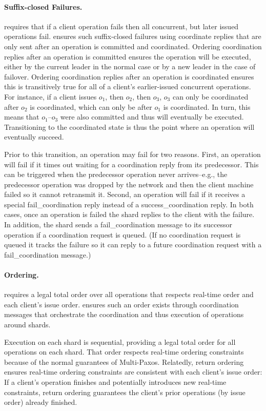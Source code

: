 \paragraph{Suffix-closed Failures.}
\Mdl{} requires that if a client operation fails then all concurrent, but later issued operations fail.
\sys{} ensures such suffix-closed failures using coordinate replies that are only sent after an operation is committed and coordinated.
Ordering coordination replies after an operation is committed ensures the operation will be executed, either by the current leader in the normal case or by a new leader in the case of failover.
Ordering coordination replies after an operation is coordinated ensures this is transitively true for all of a client's earlier-issued concurrent operations.
For instance, if a client issues $o_1$, then $o_2$, then $o_3$, $o_3$ can only be coordinated after $o_2$ is coordinated, which can only be after $o_1$ is coordinated.
In turn, this means that $o_1$--$o_3$ were also committed and thus will eventually be executed.
Transitioning to the coordinated state is thus the point where an operation will eventually succeed.

Prior to this transition, an operation may fail for two reasons.
First, an operation will fail if it times out waiting for a coordination reply from its predecessor.
This can be triggered when the predecessor operation never arrives--e.g., the predecessor operation was dropped by the network and then the client machine failed so it cannot retransmit it.
Second, an operation will fail if it receives a special fail\_coordination reply instead of a success\_coordination reply.
In both cases, once an operation is failed the shard replies to the client with the failure.
In addition, the shard sends a fail\_coordination message to its successor operation if a coordination request is queued.
(If no coordination request is queued it tracks the failure so it can reply to a future coordination request with a fail\_coordination message.)


\paragraph{\Mdl{} Ordering.}
\Mdl{} requires a legal total order over all operations that respects real-time order and each client's issue order.
\sys{} ensures such an order exists through coordination messages that orchestrate the coordination and thus execution of operations around shards.

Execution on each shard is sequential, providing a legal total order for all operations on each shard.
That order respects real-time ordering constraints because of the normal guarantees of Multi-Paxos.
Relatedly, return ordering ensures real-time ordering 
constraints are consistent with each client's issue order: If a client's operation finishes and potentially introduces new real-time constraints, return ordering guarantees the client's prior operations (by issue order) already finished.

